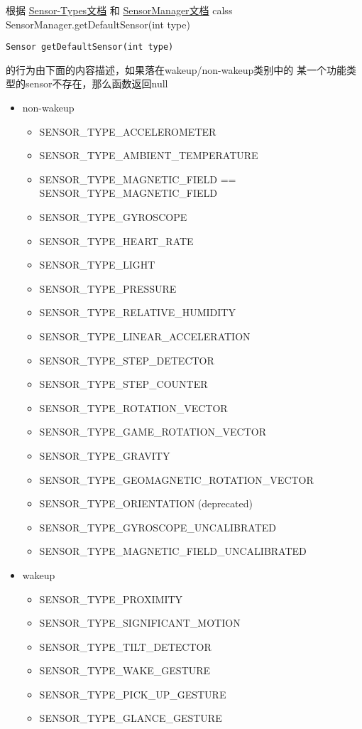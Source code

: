 \documentclass{article}
\begin{document}
\par{
根据
\href{https://source.android.com/devices/sensors/sensor-types.html}
     {Sensor-Types文档}
和
\href{https://developer.android.com/reference/android/hardware/SensorManager.html}{SensorManager文档}
calss SensorManager.getDefaultSensor(int type)
\begin{lstlisting}
Sensor getDefaultSensor(int type)
\end{lstlisting}
的行为由下面的内容描述，如果落在wakeup/non-wakeup类别中的
某一个功能类型的sensor不存在，那么函数返回null
\begin{itemize}
    \item non-wakeup
      \begin{itemize}
      \item SENSOR\_TYPE\_ACCELEROMETER
      \item SENSOR\_TYPE\_AMBIENT\_TEMPERATURE
      \item SENSOR\_TYPE\_MAGNETIC\_FIELD == SENSOR\_TYPE\_MAGNETIC\_FIELD
      \item SENSOR\_TYPE\_GYROSCOPE
      \item SENSOR\_TYPE\_HEART\_RATE
      \item SENSOR\_TYPE\_LIGHT
      \item SENSOR\_TYPE\_PRESSURE
      \item SENSOR\_TYPE\_RELATIVE\_HUMIDITY
      \item SENSOR\_TYPE\_LINEAR\_ACCELERATION
      \item SENSOR\_TYPE\_STEP\_DETECTOR
      \item SENSOR\_TYPE\_STEP\_COUNTER
      \item SENSOR\_TYPE\_ROTATION\_VECTOR
      \item SENSOR\_TYPE\_GAME\_ROTATION\_VECTOR
      \item SENSOR\_TYPE\_GRAVITY
      \item SENSOR\_TYPE\_GEOMAGNETIC\_ROTATION\_VECTOR
      \item SENSOR\_TYPE\_ORIENTATION (deprecated)
      \item SENSOR\_TYPE\_GYROSCOPE\_UNCALIBRATED
      \item SENSOR\_TYPE\_MAGNETIC\_FIELD\_UNCALIBRATED
      \end{itemize}
    \item wakeup
      \begin{itemize}
      \item SENSOR\_TYPE\_PROXIMITY
      \item SENSOR\_TYPE\_SIGNIFICANT\_MOTION
      \item SENSOR\_TYPE\_TILT\_DETECTOR
      \item SENSOR\_TYPE\_WAKE\_GESTURE
      \item SENSOR\_TYPE\_PICK\_UP\_GESTURE
      \item SENSOR\_TYPE\_GLANCE\_GESTURE
      \end{itemize}
\end{itemize}

}
\end{document}

